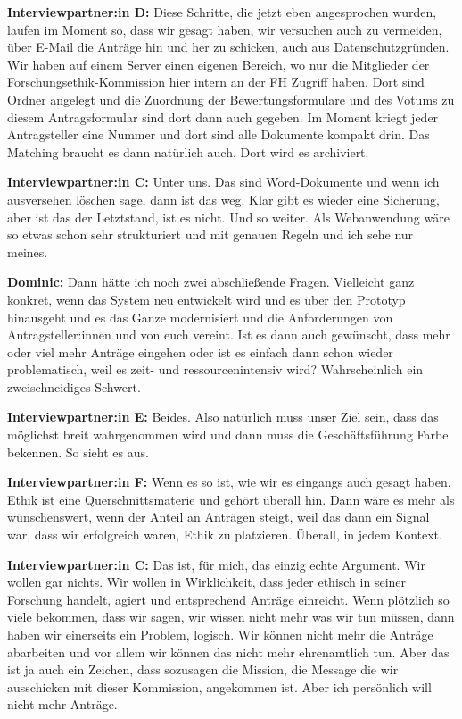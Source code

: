 \documentclass[a4paper,12pt,twoside]{scrreprt}
\begin{document}
\textbf{Interviewpartner:in D:} Diese Schritte, die jetzt eben angesprochen wurden, laufen im Moment so, dass wir gesagt haben, wir versuchen auch zu vermeiden, über E-Mail die Anträge hin und her zu schicken, auch aus Datenschutzgründen. Wir haben auf einem Server einen eigenen Bereich, wo nur die Mitglieder der Forschungsethik-Kommission hier intern an der FH Zugriff haben. Dort sind Ordner angelegt und die Zuordnung der Bewertungsformulare und des Votums zu diesem Antragsformular sind dort dann auch gegeben. Im Moment kriegt jeder Antragsteller eine Nummer und dort sind alle Dokumente kompakt drin. Das Matching braucht es dann natürlich auch. Dort wird es archiviert.

\textbf{Interviewpartner:in C:} Unter uns. Das sind Word-Dokumente und wenn ich ausversehen löschen sage, dann ist das weg. Klar gibt es wieder eine Sicherung, aber ist das der Letztstand, ist es nicht. Und so weiter. Als Webanwendung wäre so etwas schon sehr strukturiert und mit genauen Regeln und ich sehe nur meines.

\textbf{Dominic:} Dann hätte ich noch zwei abschließende Fragen. Vielleicht ganz konkret, wenn das System neu entwickelt wird und es über den Prototyp hinausgeht und es das Ganze modernisiert und die Anforderungen von Antragsteller:innen und von euch vereint. Ist es dann auch gewünscht, dass mehr oder viel mehr Anträge eingehen oder ist es einfach dann schon wieder problematisch, weil es zeit- und ressourcenintensiv wird? Wahrscheinlich ein zweischneidiges Schwert.

\textbf{Interviewpartner:in E:} Beides. Also natürlich muss unser Ziel sein, dass das möglichst breit wahrgenommen wird und dann muss die Geschäftsführung Farbe bekennen. So sieht es aus.

\textbf{Interviewpartner:in F:} Wenn es so ist, wie wir es eingangs auch gesagt haben, Ethik ist eine Querschnittsmaterie und gehört überall hin. Dann wäre es mehr als wünschenswert, wenn der Anteil an Anträgen steigt, weil das dann ein Signal war, dass wir erfolgreich waren, Ethik zu platzieren. Überall, in jedem Kontext.

\textbf{Interviewpartner:in C:} Das ist, für mich, das einzig echte Argument. Wir wollen gar nichts. Wir wollen in Wirklichkeit, dass jeder ethisch in seiner Forschung handelt, agiert und entsprechend Anträge einreicht. Wenn plötzlich so viele bekommen, dass wir sagen, wir wissen nicht mehr was wir tun müssen, dann haben wir einerseits ein Problem, logisch. Wir können nicht mehr die Anträge abarbeiten und vor allem wir können das nicht mehr ehrenamtlich tun. Aber das ist ja auch ein Zeichen, dass sozusagen die Mission, die Message die wir ausschicken mit dieser Kommission, angekommen ist. Aber ich persönlich will nicht mehr Anträge.
\end{document}

